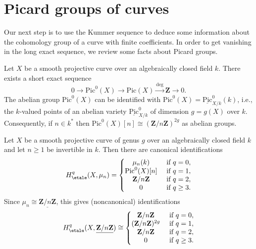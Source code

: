 \section{Picard groups of curves}
\label{section-pic-curves}

\noindent
Our next step is to use the Kummer sequence to deduce some information
about the cohomology group of a curve with finite coefficients. In order
to get vanishing in the long exact sequence, we review some facts about
Picard groups.

\medskip\noindent
Let $X$ be a smooth projective curve over an algebraically closed field $k$.
There exists a short exact sequence
$$
0\to \text{Pic}^0(X) \to \text{Pic}(X)\xrightarrow{\deg} \mathbf{Z} \to 0.
$$
The abelian group $\text{Pic}^0(X)$ can be identified with $\text{Pic}^0(X) =
\underline{\text{Pic}}^0_{X/k}(k)$, i.e., the $k$-valued points of an
abelian variety $\underline{\text{Pic}}^0_{X/k}$ of dimension $g = g(X)$ over
$k$. Consequently, if $n\in k^*$ then $\text{Pic}^0(X)[n] \cong
\left(\mathbf{Z}/n\mathbf{Z}\right)^{2g}$ as abelian groups.

\begin{lemma}
\label{lemma-cohomology-smooth-projective-curve}
Let $X$ be a smooth projective curve of genus $g$ over an
algebraically closed field $k$ and let $n \geq 1$ be invertible in $k$.
Then there are canonical identifications
$$
H_\etale^q(X, \mu_n) =
\left\{
\begin{matrix}
\mu_n(k) & \text{ if }q = 0, \\
\text{Pic}^0(X)[n] & \text{ if }q = 1, \\
\mathbf{Z}/n\mathbf{Z} & \text{ if }q = 2, \\
0 & \text{ if }q \geq 3.
\end{matrix}
\right.
$$
Since $\mu_n \cong \underline{\mathbf{Z}/n\mathbf{Z}}$, this gives
(noncanonical) identifications
$$
H_\etale^q(X, \underline{\mathbf{Z}/n\mathbf{Z}}) \cong
\left\{
\begin{matrix}
\mathbf{Z}/n\mathbf{Z} & \text{ if }q = 0, \\
(\mathbf{Z}/n\mathbf{Z})^{2g} & \text{ if }q = 1, \\
\mathbf{Z}/n\mathbf{Z} & \text{ if }q = 2, \\
0 & \text{ if }q \geq 3.
\end{matrix}
\right.
$$
\end{lemma}

